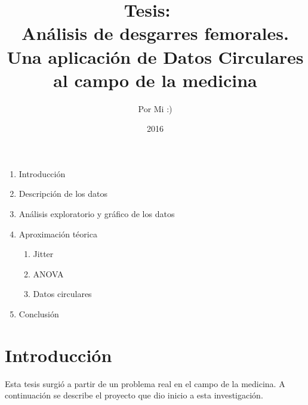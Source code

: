 \documentclass{article}
\title{Tesis: \ \\ Análisis de desgarres femorales. Una aplicación de Datos Circulares al campo de la medicina} %
\author{Por Mi :)}
\date{2016}
\begin{document}
\begin{enumerate}
	\item Introducción
	\item Descripción de los datos
	\item Análisis exploratorio y gráfico de los datos
	\item Aproximación téorica
		\begin{enumerate}
			\item Jitter
			\item ANOVA
			\item Datos circulares
		\end{enumerate}
	\item Conclusión		
\end{enumerate}

\maketitle
\section{Introducción}
	Esta tesis surgió a partir de un problema real en el campo de la medicina. A continuación se describe el proyecto que dio inicio a esta investigación.
\end{document}
